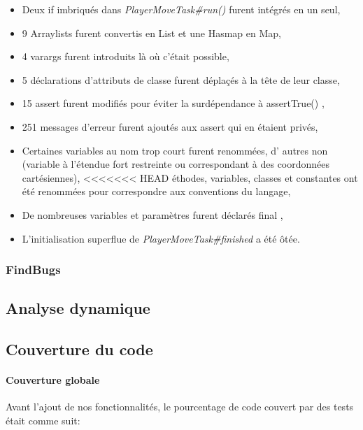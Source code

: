 \documentclass[12pt, openany]{report}
\begin{document}
\begin{itemize}
	\item Deux \og if \fg{} imbriqués dans \mbox{\textit{PlayerMoveTask\#run()}} furent intégrés en un seul,
	\item 9 Arraylists furent convertis en List et une Hasmap en Map,
	\item 4 \og varargs \fg{} furent introduits là où c'était possible,
	\item 5 déclarations d'attributs de classe furent déplaçés à la tête de leur classe,
	\item 15 \og assert \fg{} furent modifiés pour éviter la surdépendance à \og assertTrue() \fg{},
	\item 251 messages d'erreur furent ajoutés aux \og assert \fg{} qui en étaient privés,
	\item Certaines variables au nom trop court furent renommées, d' autres non (variable à l'étendue fort restreinte ou correspondant à des coordonnées cartésiennes),
<<<<<<< HEAD
éthodes, variables, classes et constantes ont été renommées pour correspondre aux conventions du langage,
	\item De nombreuses variables et paramètres furent déclarés \og final \fg{},
	\item L'initialisation superflue de \mbox{\textit{PlayerMoveTask\#finished}} a été ôtée.
\end{itemize}

\subsubsection*{FindBugs}
\subsection{Analyse dynamique}


\subsection{Couverture du code}
\paragraph{Couverture globale}

Avant l'ajout de nos fonctionnalités, le pourcentage de code couvert par des tests était comme suit: 
\end{document}

